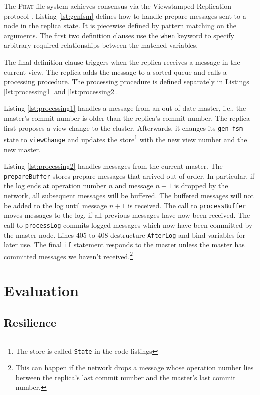 \documentclass[10pt,letter]{article}
\newcommand{\phat}[0]{\textsc{Phat}}
\begin{document}
The \phat{} file system achieves consensus via the Viewstamped Replication
protocol \cite{liskov2012viewstamped}. Listing \ref{lst:genfsm} defines how to
handle prepare messages sent to a node in the replica state. It is piecewise
defined by pattern matching on the arguments. The first two definition clauses
use the \lstinline!when! keyword to specify arbitrary required relationships
between the matched variables.

The final definition clause triggers when the replica receives a message in the
current view. The replica adds the message to a sorted queue and calls a
processing procedure. The processing procedure is defined separately in Listings
\ref{lst:processing1} and \ref{lst:processing2}.

Listing \ref{lst:processing1} handles a message from an out-of-date master,
i.e., the master's commit number is older than the replica's commit number. The
replica first proposes a view change to the cluster. Afterwards, it changes its
\texttt{gen\_fsm} state to \lstinline!viewChange! and updates the
store\footnote{The store is called \lstinline!State! in the code listings} with
the new view number and the new master.

Listing \ref{lst:processing2} handles messages from the current master. The
\lstinline!prepareBuffer! stores prepare messages that arrived out of order. In
particular, if the log ends at operation number $n$ and message $n+1$ is dropped
by the network, all subsequent messages will be buffered. The buffered messages
will not be added to the log until message $n+1$ is received. The call to
\lstinline!processBuffer! moves messages to the log, if all previous messages
have now been received. The call to \lstinline!processLog! commits logged
messages which now have been committed by the master node. Lines 405 to 408
destructure \lstinline!AfterLog! and bind variables for later use. The final
\lstinline!if! statement responds to the master unless the master has committed
messages we haven't received.\footnote{This can happen if the network drops a
  message whose operation number lies between the replica's last commit number
  and the master's last commit number.}

\section{Evaluation}

\subsection{Resilience}
\end{document}
